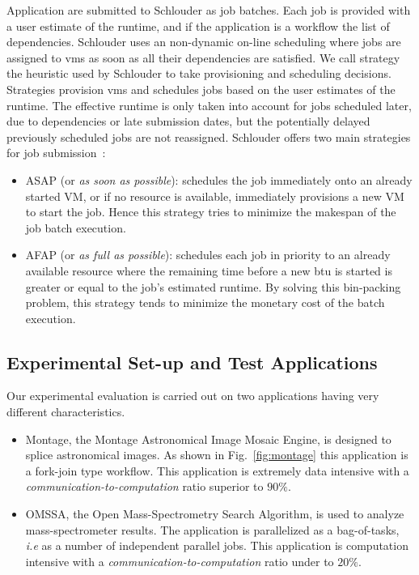 \documentclass[10pt,conference,compsocconf]{IEEEtran}
\begin{document}
Application are submitted to Schlouder as job batches. Each job is provided with
a user estimate of the runtime, and if the application is a workflow the list of
dependencies. Schlouder uses an non-dynamic on-line scheduling where jobs are
assigned to \acp{vm} as soon as all their dependencies are satisfied. We call
strategy the heuristic used by Schlouder to take provisioning and scheduling
decisions. Strategies provision \acp{vm} and schedules jobs based on the user
estimates of the runtime. The effective runtime is only taken into account for
jobs scheduled later, due to dependencies or late submission dates, but the
potentially delayed previously scheduled jobs are not reassigned. Schlouder
offers two main strategies for job submission~:
\begin{itemize}
\item ASAP (or \textit{as soon as possible}): schedules the job immediately onto
  an already started VM, or if  no resource is available, immediately provisions
  a new VM to start the job.  Hence this strategy tries to minimize the makespan
  of the job batch execution.

\item AFAP (or \textit{as full as  possible}): schedules each job in priority to
	an already  available resource where  the remaining time  before a new
	\ac{btu} is started is greater or equal to the job's estimated runtime.
	By solving this bin-packing problem, this strategy tends to minimize the
	monetary cost of the batch execution.
\end{itemize}

\subsection{Experimental Set-up and Test Applications}
\label{sc:setup}

Our experimental evaluation is carried out on two applications having very
different characteristics.
\begin{itemize}
	\item Montage\cite{montage2009}, the Montage Astronomical Image Mosaic
		Engine, is designed to splice astronomical images. As shown in
		Fig.~\ref{fig:montage} this application is a fork-join type
		workflow. This application is extremely data intensive with a
		\emph{communication-to-computation} ratio superior to $90\%$.
	\item OMSSA\cite{Geer2004}, the Open Mass-Spectrometry Search Algorithm, 
		is used to analyze mass-spectrometer results. The application is
                parallelized as a bag-of-tasks, \textit{i.e} as a number of
                independent parallel jobs. This application is
		computation intensive with a
		\emph{communication-to-computation} ratio under to $20\%$.
\end{itemize}
\end{document}
